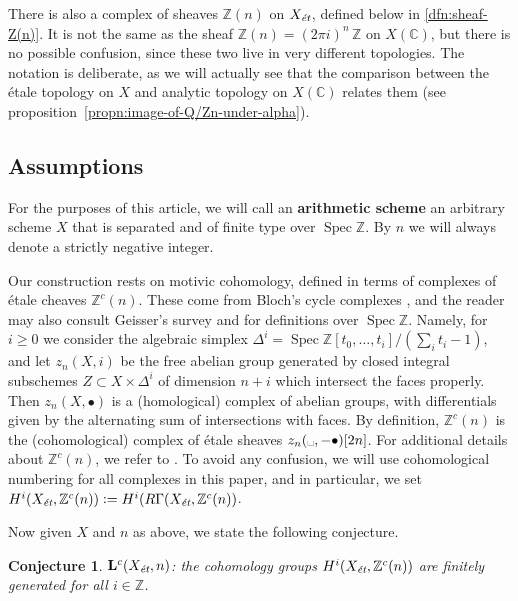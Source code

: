 \documentclass[draft,leqno,12pt]{article}
\theoremstyle{plain}
\newtheorem{conjecture}[theorem]{\indent\sc Conjecture}
\theoremstyle{definition}
\DeclareMathOperator{\Spec}{Spec}
\newcommand{\ZZ}{\mathbb{Z}}
\newcommand{\CC}{\mathbb{C}}
\newcommand{\dfn}{\mathrel{\mathop:}=}
\newcommand{\et}{\text{\it \'{e}t}}
\begin{document}
There is also a complex of sheaves $\ZZ (n)$ on $X_\et$, defined below in
\ref{dfn:sheaf-Z(n)}. It is not the same as the sheaf
$\ZZ (n) = (2\pi i)^n\,\ZZ$ on $X (\CC)$, but there is no possible confusion,
since these two live in very different topologies. The notation is deliberate,
as we will actually see that the comparison between the \'{e}tale topology on $X$
and analytic topology on $X (\CC)$ relates them
(see proposition~\ref{propn:image-of-Q/Zn-under-alpha}).

\subsection*{Assumptions}

For the purposes of this article, we will call an \textbf{arithmetic scheme} an
arbitrary scheme $X$ that is separated and of finite type over $\Spec \ZZ$.
By $n$ we will always denote a strictly negative integer.

Our construction rests on motivic cohomology, defined in terms of complexes
of \'{e}tale cheaves $\ZZ^c (n)$. These come from Bloch's cycle complexes
\cite{Bloch-1986}, and the reader may also consult Geisser's survey
\cite{Geisser-2005} and \cite{Geisser-2004-Dedekind} for definitions over
$\Spec \ZZ$. Namely, for $i \ge 0$ we consider the algebraic simplex
$\Delta^i = \Spec \ZZ[t_0,\ldots,t_i]/(\sum_i t_i - 1)$, and let $z_n (X,i)$ be
the free abelian group generated by closed integral subschemes
$Z \subset X \times \Delta^i$ of dimension $n + i$ which intersect the faces
properly. Then $z_n (X, \bullet)$ is a (homological) complex of abelian groups,
with differentials given by the alternating sum of intersections with faces.
By definition, $\ZZ^c (n)$ is the (cohomological) complex of \'{e}tale sheaves
$z_n (\text{\textvisiblespace}, -\bullet) [2n]$. For additional details about
$\ZZ^c (n)$, we refer to \cite[\S 2]{Geisser-2010}. To avoid any confusion,
we will use cohomological numbering for all complexes in this paper, and in
particular, we set $H^i (X_\et, \ZZ^c(n)) \dfn H^i (R\Gamma (X_\et, \ZZ^c(n))$.

\vspace{1em}

Now given $X$ and $n$ as above, we state the following conjecture.

\begin{conjecture}
  $\mathbf{L}^c (X_\et,n)$: the cohomology groups $H^i (X_\et, \ZZ^c (n))$ are
  finitely generated for all $i \in \ZZ$.
\end{conjecture}
\end{document}

